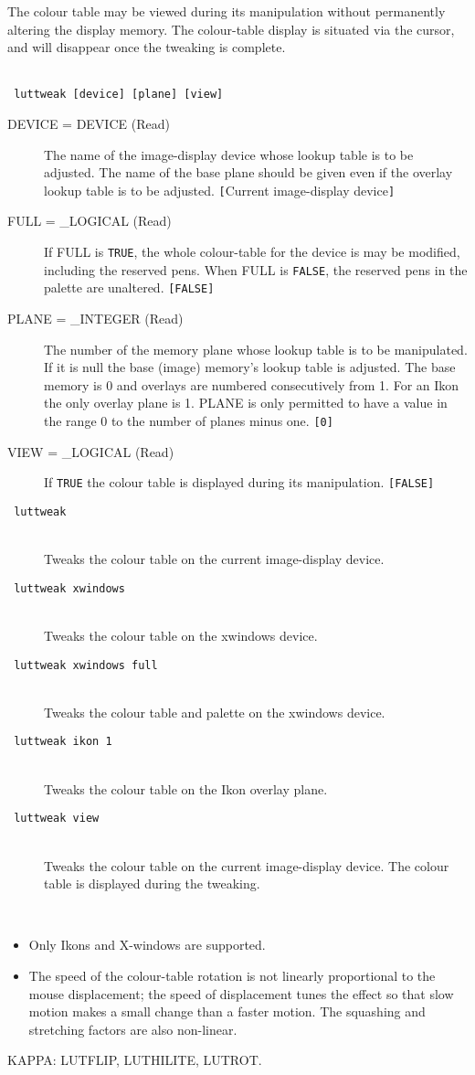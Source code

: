 \documentclass[twoside,11pt]{article}
\newcommand{\htmlref}[2]{#1}
\newcommand{\sstusage}[1]{\pagebreak[3] \item[Usage:] \mbox{} \\[1.3ex] {\ssttt #1}}
\newcommand{\sstparameters}[1]{
   \goodbreak 
   \item[Parameters:] \mbox{} \\
   \vspace{-3.5ex}
   \begin{description}
      #1
   \end{description}
}
\newcommand{\sstexamples}[1]{
   \goodbreak
   \item[Examples:] \mbox{} \\
   \vspace{-3.5ex}
   \begin{description}
      #1
   \end{description}
}
\newcommand{\sstsubsection}[1]{ \item[{#1}] \mbox{} \\}
\newcommand{\sstexamplesubsection}[2]{\sloppy \item{\ssttt #1} \mbox{} \\ #2 }
\newcommand{\sstnotes}[1]{\pagebreak[3] \item[Notes:] \mbox{} \\[1.3ex] #1}
\newcommand{\sstdiytopic}[2]{\goodbreak \item[{\hspace{-0.35em}#1\hspace{-0.35em}:}] \mbox{} \\[1.3ex] #2}
\newenvironment{sstitemize}{%
  \vspace{-4.3ex}\begin{itemize}}{\end{itemize}}
\newcommand{\sstitemlist}[1]{
  \mbox{} \\
  \vspace{-3.5ex}
  \begin{sstitemize}
     #1
  \end{sstitemize}
}
\newcommand{\sstitem}{\item}
\newcommand{\ssttt}{\tt}
\renewcommand{\sstusage}[1]{\htmlref{\item[Usage:]}{ap:usage} \mbox{} \\ {\ssttt #1}}
\renewcommand{\sstparameters}[1]{
      \htmlref{\item[Parameters:]}{se:param}
      \begin{description}
         #1
      \end{description}
   }
\renewcommand{\sstexamples}[1]{
      \htmlref{\item[Examples:]}{ap:example}
      \begin{description}
         #1
      \end{description}
   }
\renewcommand{\sstsubsection}[1]{\item[{#1}]}
\renewcommand{\sstexamplesubsection}[2]{\item[{\ssttt #1}] \\ #2}
\renewcommand{\sstnotes}[1]{\item[Notes:]
      \begin{description}
         #1
      \end{description}
   }
\renewcommand{\sstdiytopic}[2]{\item[{#1}]
      \begin{description}
         #2
      \end{description}
   }
\newcommand{\sstitemlist}[1]{
      \begin{itemize}
         #1
      \end{itemize}
   }
\begin{document}
{{      The colour table may be viewed during its manipulation without
      permanently altering the display memory.  The colour-table
      display is situated via the cursor, and will disappear once the
      tweaking is complete.
   }
   \sstusage{
      luttweak [device] [plane] [view]
   }
   \sstparameters{
      \sstsubsection{
         DEVICE = DEVICE (Read)
      }{
         The name of the image-display device whose lookup table is to
         be adjusted.  The name of the base plane should be given even
         if the overlay lookup table is to be adjusted.
         {\tt [}Current image-display device{\tt ]}
      }
      \sstsubsection{
         FULL = \_LOGICAL (Read)
      }{
         If FULL is {\tt TRUE}, the whole colour-table for the device is
         may be modified, including the reserved pens.  When FULL
         is {\tt FALSE}, the reserved pens in the palette are unaltered.
         {\tt [FALSE]}
      }
      \sstsubsection{
         PLANE = \_INTEGER (Read)
      }{
         The number of the memory plane whose lookup table is to be
         manipulated.  If it is null the base (image) memory's lookup
         table is adjusted.  The base memory is 0 and overlays are
         numbered consecutively from 1.  For an Ikon the only overlay
         plane is 1.  PLANE is only permitted to have a value in the
         range 0 to the number of planes minus one. {\tt [0]}
      }
      \sstsubsection{
         VIEW = \_LOGICAL (Read)
      }{
         If {\tt TRUE} the colour table is displayed during its manipulation.
         {\tt [FALSE]}
      }
   }
   \sstexamples{
      \sstexamplesubsection{
         luttweak
      }{
         Tweaks the colour table on the current image-display device.
      }
      \sstexamplesubsection{
         luttweak xwindows
      }{
         Tweaks the colour table on the xwindows device.
      }
      \sstexamplesubsection{
         luttweak xwindows full
      }{
         Tweaks the colour table and palette on the xwindows device.
      }
      \sstexamplesubsection{
         luttweak ikon 1
      }{
         Tweaks the colour table on the Ikon overlay plane.
      }
      \sstexamplesubsection{
         luttweak view
      }{
         Tweaks the colour table on the current image-display device.
         The colour table is displayed during the tweaking.
      }
   }
   \sstnotes{
      \sstitemlist{

         \sstitem
         Only Ikons and X-windows are supported.

         \sstitem
         The speed of the colour-table rotation is not linearly
         proportional to the mouse displacement; the speed of displacement
         tunes the effect so that slow motion makes a small change than
         a faster motion.  The squashing and stretching factors are also
         non-linear.
      }
   }
   \sstdiytopic{
      Related Applications
   }{
      KAPPA: LUTFLIP, LUTHILITE, LUTROT.
   }
}
\end{document}
